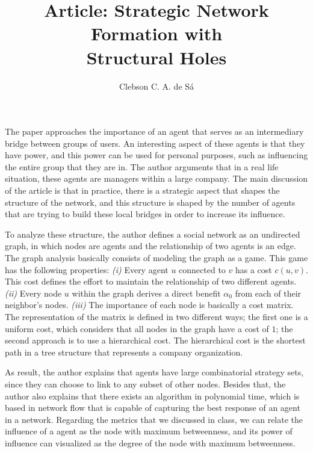 \documentclass[12pt, letterpaper]{article}
\title{Article: Strategic Network Formation with \\ Structural Holes}
\author{Clebson C. A. de Sá}
\begin{document}
\maketitle


The paper approaches the importance of an agent that serves as an intermediary bridge between groups of users.
An interesting aspect of these agents is that they have power, and this power can be used for personal purposes, such as influencing the entire group that they are in. 
The author arguments that in a real life situation, these agents are managers within a large company.
The main discussion of the article is that in practice, there is a strategic aspect that shapes the structure of the network, and this structure is shaped by the number of agents that are trying to build these local bridges in order to increase its influence.

To analyze these structure, the author defines a social network as an undirected graph, in which nodes are agents and the relationship of two agents is an edge.
The graph analysis basically consists of modeling the graph as a game. This game has the following properties: 
\textit{(i)} Every agent $u$ connected to $v$ has a cost $c(u, v)$. This cost defines the effort to maintain the relationship of two different agents.
\textit{(ii)} Every node $u$ within the graph derives a direct benefit $\alpha_0$ from each of their neighbor's nodes.
\textit{(iii)} The importance of each node is basically a cost matrix. The representation of the matrix is defined in two different ways; the first one is a uniform cost, which considers that all nodes in the graph have a cost of $1$; the second approach is to use a hierarchical cost. The hierarchical cost is the shortest path in a tree structure that represents a company organization.

As result, the author explains that agents have large combinatorial strategy sets, since they can choose to link to any subset of other nodes. Besides that, the author also explains that there exists an algorithm in polynomial time, which is based in network flow that is capable of capturing the best response of an agent in a network.
Regarding the metrics that we discussed in class, we can relate the influence of a agent as the node with maximum betweenness, and its power of influence can visualized as the degree of the node with maximum betweenness.
\end{document}
